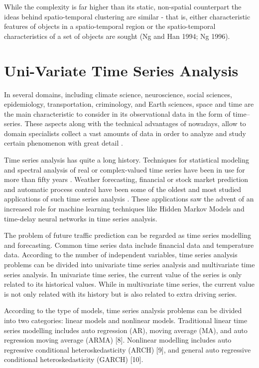 While the complexity is far higher than its static, non-spatial counterpart the ideas behind spatio-temporal clustering are similar - that is, either characteristic features of objects in a spatio-temporal region or the spatio-temporal characteristics of a set of objects are sought (Ng and Han 1994; Ng 1996).

\section{Uni-Variate Time Series Analysis}
\label{Sec:TSAnalysis}

In several domains, including climate science, neuroscience, social sciences, epidemiology, transportation, criminology, and Earth sciences, space and time are the main characteristic to consider in its observational data in the form of time--series. These aspects along with the technical advantages of nowadays, allow to domain specialists collect a vast amounts of data in order to analyze and study certain phenomenon with great detail \cite{}. 

Time series analysis has quite a long history. Techniques for statistical modeling and spectral analysis of real or complex-valued time series have been in use for more than fifty years \cite{Hyndman2006, Chatfield2019}. Weather forecasting, financial or stock market prediction and automatic process control have been some of the oldest and most studied applications of such time series analysis \cite{Box1976}. These applications saw the advent of an increased role for machine learning techniques like Hidden Markov Models and time-delay neural networks in time series analysis.

The problem of future traffic prediction can be regarded as time series modelling and forecasting. Common time series data include financial data and temperature data. According to the number of independent variables, time series analysis problems can be divided into univariate time series analysis and multivariate time series analysis. In univariate time series, the current value of the series is only related to its historical values. While in multivariate time series, the current value is not only related with its history but is also related to extra driving series. 

According to the type of models, time series analysis problems can be divided into two categories: linear models and nonlinear models. Traditional linear time series modelling includes auto regression (AR), moving average (MA), and auto regression moving average (ARMA) [8]. Nonlinear modelling includes auto regressive conditional heteroskedasticity (ARCH) [9], and general auto regressive conditional heteroskedasticity (GARCH) [10].

